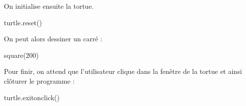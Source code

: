 \begin{exercise}[title=Dessin de carré, level=intermediate]
On initialise ensuite la tortue.


\begin{idleconsole}
\begin{pyconsole}
turtle.reset()
\end{pyconsole}
\end{idleconsole}

On peut alors dessiner un carré :


\begin{idleconsole}
\begin{pyconsole}
square(200)
\end{pyconsole}
\end{idleconsole}

Pour finir, on attend que l'utilisateur clique dans la fenêtre de la tortue et ainsi clôturer le programme :

%

\begin{idleconsole}
\begin{pyconsole}
turtle.exitonclick()
\end{pyconsole}
\end{idleconsole}

\end{exercise}


